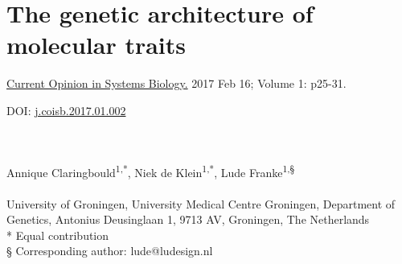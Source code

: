 \chapterfont{\color{LightBlue}}  %
\sectionfont{\color{LightBlue}}  %
\subsectionfont{\color{LightBlue}}  %

\renewcommand\pcolor{LightBlue}
\renewcommand{\headrule}{\hbox to\headwidth{%
		\color{LightBlue}\leaders\hrule height \headrulewidth\hfill}} %
\fancyfoot[LE,RO]{\thepage}

{ \Large {} }

\chapter[The genetic architecture of molecular traits]{The genetic architecture of molecular traits}
\chaptermark{}
\label{chap:chapter2-genetic-architecture}

\hfill \underline{Current Opinion in Systems Biology.} 2017 Feb 16; Volume 1: p25-31.

\hfill DOI: \href{https://doi.org/10.1016/j.coisb.2017.01.002}{j.coisb.2017.01.002}


\noindent
\\
\\
Annique Claringbould\textsuperscript{1,*}, Niek de Klein\textsuperscript{1,*}, Lude Franke\textsuperscript{1,§}
\\
\\
 University of Groningen, University Medical Centre Groningen, Department of Genetics, Antonius Deusinglaan 1, 9713 AV, Groningen, The Netherlands\\
* Equal contribution\\
§ Corresponding author: lude@ludesign.nl
\\
\\
\noindent



